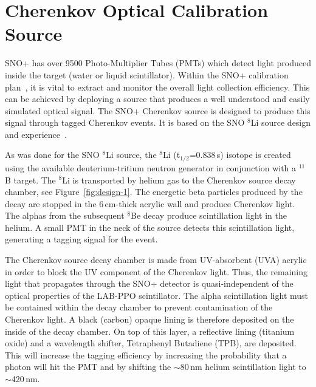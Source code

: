 \newcommand{\Li}{$^{8}$Li }
\renewcommand{\bf}{\bfseries}

\chapter{Cherenkov Optical Calibration Source}
\label{ch:chsrc}

\label{chap:execsummary}

SNO+ has over 9500 Photo-Multiplier Tubes (PMTs) which detect light produced inside the target (water or liquid scintillator). Within the SNO+ calibration plan~\cite{gann:2013}, it is vital to extract and monitor the overall light collection efficiency. This can be achieved by deploying a source that produces a well understood and easily simulated optical signal. The SNO+ Cherenkov source is designed to produce this signal through tagged Cherenkov events. It is based on the SNO \Li source design and experience~\cite{Tagg:2002,Tagg:2001}.


As was done for the SNO \Li source, the \Li (t$_{1/2}$=0.838\,s) isotope is created using the available deuterium-tritium neutron generator in conjunction with a $^{11}$B target. The \Li is transported by helium gas to the Cherenkov source decay chamber, see Figure~\ref{fig:design-1}. The energetic beta particles produced by the decay are stopped in the 6\,cm-thick acrylic wall and produce Cherenkov light. The alphas from the subsequent $^{8}$Be decay produce scintillation light in the helium. A small PMT in the neck of the source detects this scintillation light, generating a tagging signal for the event. 

The Cherenkov source decay chamber is made from UV-absorbent (UVA) acrylic in order to block the UV component of the Cherenkov light. Thus, the remaining light that propagates through the SNO+ detector is quasi-independent of the optical properties of the LAB-PPO scintillator. The alpha scintillation light must be contained within the decay chamber to prevent contamination of the Cherenkov light. A black (carbon) opaque lining is therefore deposited on the inside of the decay chamber. On top of this layer, a reflective lining (titanium oxide) and a wavelength shifter, Tetraphenyl Butadiene (TPB), are deposited. This will increase the tagging efficiency by increasing the probability that a photon will hit the PMT and by shifting the  $\sim$80\,nm helium scintillation light to $\sim$420\,nm.


